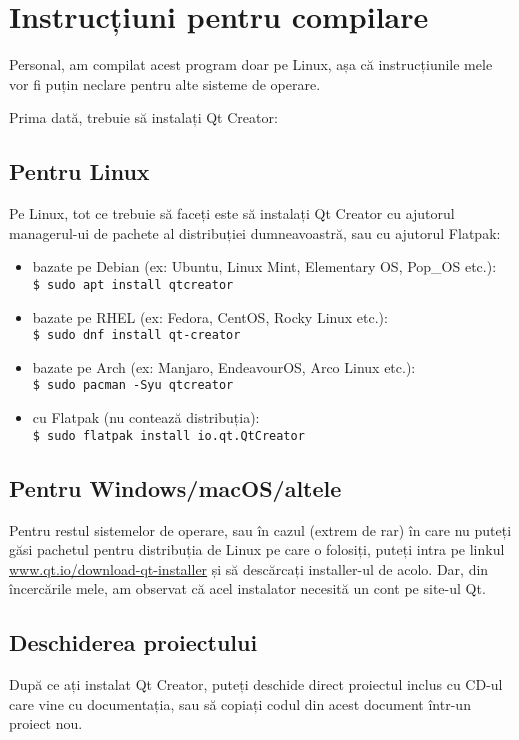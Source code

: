 \section{Instrucțiuni pentru compilare}
Personal, am compilat acest program doar pe Linux, așa că instrucțiunile mele vor fi puțin neclare pentru alte sisteme de operare.

Prima dată, trebuie să instalați Qt Creator:

\subsection{Pentru Linux}
Pe Linux, tot ce trebuie să faceți este să instalați Qt Creator cu ajutorul managerul-ui de pachete al distribuției dumneavoastră, sau cu ajutorul Flatpak:
\begin{itemize}
 \item bazate pe Debian (ex: Ubuntu, Linux Mint, Elementary OS, Pop\_OS etc.):\\
  \texttt{\$ sudo apt install qtcreator}
 \item bazate pe RHEL (ex: Fedora, CentOS, Rocky Linux etc.):\\
  \texttt{\$ sudo dnf install qt-creator}
 \item bazate pe Arch (ex: Manjaro, EndeavourOS, Arco Linux etc.):\\
  \texttt{\$ sudo pacman -Syu qtcreator}
 \item cu Flatpak (nu contează distribuția):\\
  \texttt{\$ sudo flatpak install io.qt.QtCreator}
\end{itemize}

\subsection{Pentru Windows/macOS/altele}
Pentru restul sistemelor de operare, sau în cazul (extrem de rar) în care nu puteți găsi pachetul pentru distribuția de Linux pe care o folosiți, puteți intra pe linkul \url{www.qt.io/download-qt-installer} și să descărcați installer-ul de acolo. Dar, din încercările mele, am observat că acel instalator necesită un cont pe site-ul Qt.

\subsection{Deschiderea proiectului}
După ce ați instalat Qt Creator, puteți deschide direct proiectul inclus cu CD-ul care vine cu documentația, sau să copiați codul din acest document într-un proiect nou.
